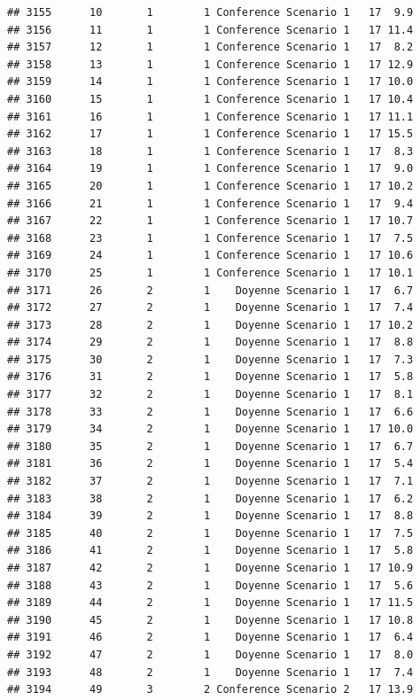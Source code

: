 \documentclass[
]{article}
\begin{document}
\begin{verbatim}
## 3155      10       1        1 Conference Scenario 1   17  9.9
## 3156      11       1        1 Conference Scenario 1   17 11.4
## 3157      12       1        1 Conference Scenario 1   17  8.2
## 3158      13       1        1 Conference Scenario 1   17 12.9
## 3159      14       1        1 Conference Scenario 1   17 10.0
## 3160      15       1        1 Conference Scenario 1   17 10.4
## 3161      16       1        1 Conference Scenario 1   17 11.1
## 3162      17       1        1 Conference Scenario 1   17 15.5
## 3163      18       1        1 Conference Scenario 1   17  8.3
## 3164      19       1        1 Conference Scenario 1   17  9.0
## 3165      20       1        1 Conference Scenario 1   17 10.2
## 3166      21       1        1 Conference Scenario 1   17  9.4
## 3167      22       1        1 Conference Scenario 1   17 10.7
## 3168      23       1        1 Conference Scenario 1   17  7.5
## 3169      24       1        1 Conference Scenario 1   17 10.6
## 3170      25       1        1 Conference Scenario 1   17 10.1
## 3171      26       2        1    Doyenne Scenario 1   17  6.7
## 3172      27       2        1    Doyenne Scenario 1   17  7.4
## 3173      28       2        1    Doyenne Scenario 1   17 10.2
## 3174      29       2        1    Doyenne Scenario 1   17  8.8
## 3175      30       2        1    Doyenne Scenario 1   17  7.3
## 3176      31       2        1    Doyenne Scenario 1   17  5.8
## 3177      32       2        1    Doyenne Scenario 1   17  8.1
## 3178      33       2        1    Doyenne Scenario 1   17  6.6
## 3179      34       2        1    Doyenne Scenario 1   17 10.0
## 3180      35       2        1    Doyenne Scenario 1   17  6.7
## 3181      36       2        1    Doyenne Scenario 1   17  5.4
## 3182      37       2        1    Doyenne Scenario 1   17  7.1
## 3183      38       2        1    Doyenne Scenario 1   17  6.2
## 3184      39       2        1    Doyenne Scenario 1   17  8.8
## 3185      40       2        1    Doyenne Scenario 1   17  7.5
## 3186      41       2        1    Doyenne Scenario 1   17  5.8
## 3187      42       2        1    Doyenne Scenario 1   17 10.9
## 3188      43       2        1    Doyenne Scenario 1   17  5.6
## 3189      44       2        1    Doyenne Scenario 1   17 11.5
## 3190      45       2        1    Doyenne Scenario 1   17 10.8
## 3191      46       2        1    Doyenne Scenario 1   17  6.4
## 3192      47       2        1    Doyenne Scenario 1   17  8.0
## 3193      48       2        1    Doyenne Scenario 1   17  7.4
## 3194      49       3        2 Conference Scenario 2   17 13.9

\end{verbatim}
\end{document}
